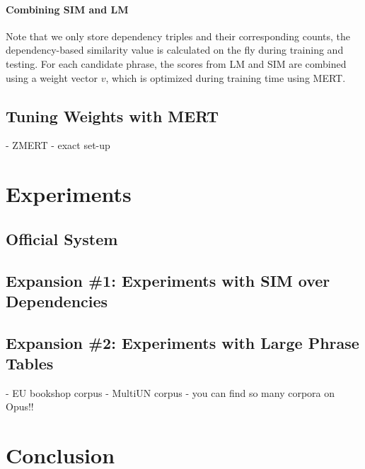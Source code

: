 \documentclass[11pt]{article}
\begin{document}
\paragraph{Combining SIM and LM}
Note that we only store dependency triples and their corresponding counts, the dependency-based similarity value is calculated on the fly during training and testing. For each candidate phrase, the scores from LM and SIM are combined using a weight vector $v$, which is optimized during training time using MERT. 



\subsection{Tuning Weights with MERT}
\label{sec:mert}

- ZMERT \cite{zaidan:zmert:09}
- exact set-up

\section{Experiments}
\label{sec:exp}

\subsection{Official System}
\label{sec:exp:official}

\cite{nltkbook}

\subsection{Expansion \#1: Experiments with SIM over Dependencies}
\label{sec:exp:sim}

\subsection{Expansion \#2: Experiments with Large Phrase Tables}
\label{sec:exp:large-pts}

- EU bookshop corpus
- MultiUN corpus
- you can find so many corpora on Opus!! \cite{tiedemann:12}

\section{Conclusion} 



\end{document}
